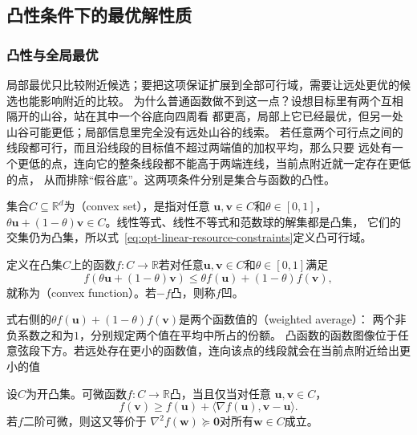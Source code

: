 \noindent\begin{minipage}{\linewidth}
\subsection{凸性条件下的最优解性质}
\label{sec:opt-convexity}

\subsubsection{凸性与全局最优}

局部最优只比较附近候选；要把这项保证扩展到全部可行域，需要让远处更优的候选也能影响附近的比较。
为什么普通函数做不到这一点？设想目标里有两个互相隔开的山谷，站在其中一个谷底向四周看
都更高，局部上它已经最优，但另一处山谷可能更低；局部信息里完全没有远处山谷的线索。
若任意两个可行点之间的线段都可行，而且沿线段的目标值不超过两端值的加权平均，那么只要
远处有一个更低的点，连向它的整条线段都不能高于两端连线，当前点附近就一定存在更低的点，
从而排除“假谷底”。这两项条件分别是集合与函数的凸性。
\end{minipage}\par
\begin{definition}[凸集与凸函数]
\label{def:opt-convex-set-function}
集合$C\subseteq\mathbb R^d$为（convex set），是指对任意
$\bm{u},\bm{v}\in C$和$\theta\in[0,1]$，
$\theta\bm{u}+(1-\theta)\bm{v}\in C$。线性等式、线性不等式和范数球的解集都是凸集，
它们的交集仍为凸集，所以式~\eqref{eq:opt-linear-resource-constraints}定义凸可行域。

定义在凸集$C$上的函数$f:C\to\mathbb R$若对任意$\bm u,\bm v\in C$和$\theta\in[0,1]$满足
\begin{equation}
  f(\theta\bm{u}+(1-\theta)\bm{v})
  \leq
  \theta f(\bm{u})+(1-\theta)f(\bm{v}),
  \label{eq:opt-convex-function}
\end{equation}
就称为（convex function）。若$-f$凸，则称$f$凹。
\end{definition}
式右侧的$\theta f(\bm u)+(1-\theta)f(\bm v)$是两个函数值的（weighted average）：
两个非负系数之和为$1$，分别规定两个值在平均中所占的份额。
凸函数的函数图像位于任意弦段下方。若远处存在更小的函数值，连向该点的线段就会在当前点附近给出更小的值

\begin{theorem}[凸函数的一阶与二阶判据]
\label{thm:opt-convexity-criteria}
设$C$为开凸集。可微函数$f:C\to\mathbb{R}$凸，当且仅当对任意
$\bm{u},\bm{v}\in C$，
\begin{equation}
  f(\bm{v})\geq f(\bm{u})
  +\langle\nabla f(\bm{u}),\bm{v}-\bm{u}\rangle.
  \label{eq:opt-first-order-convexity}
\end{equation}
若$f$二阶可微，则这又等价于
$\nabla^2f(\bm{w})\succeq\bm{0}$对所有$\bm{w}\in C$成立。
\end{theorem}

